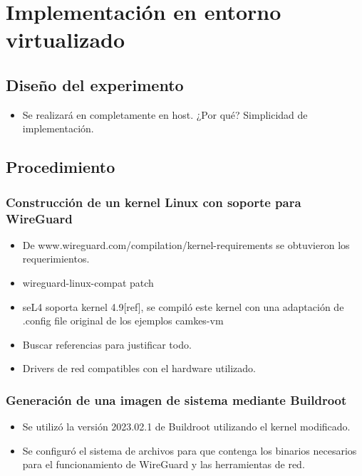 \chapter{Implementación en entorno virtualizado} %
\section{Diseño del experimento}
\begin{itemize}
    \item Se realizará en completamente en host. ¿Por qué? Simplicidad de implementación.
\end{itemize}
\section{Procedimiento} %
  
\subsection{Construcción de un kernel Linux con soporte para WireGuard}
\begin{itemize}
    \item De www.wireguard.com/compilation/kernel-requirements se obtuvieron los requerimientos.
    \item wireguard-linux-compat patch
    \item seL4 soporta kernel 4.9[ref], se compiló este kernel con una adaptación de .config file original de los ejemplos camkes-vm
    \item Buscar referencias para justificar todo. \cite{Laricch2009AAMOP_ICBp3}

    \item Drivers de red compatibles con el hardware utilizado.
\end{itemize}

\subsection{Generación de una imagen de sistema mediante Buildroot}
\begin{itemize}
    \item Se utilizó la versión 2023.02.1 de Buildroot utilizando el kernel modificado.
    \item Se configuró el sistema de archivos para que contenga los binarios necesarios para el funcionamiento de WireGuard y las herramientas de red.
\end{itemize}

